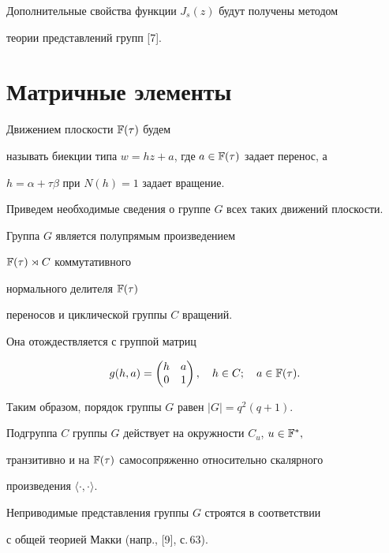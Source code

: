 Дополнительные свойства функции $J_s(z)$ будут получены методом 


теории представлений групп [7].





\section{Матричные элементы}





Движением плоскости $\Bbb F(\tau)$ будем


называть биекции типа $w=hz+a$, где $a\in{\Bbb F(\tau)}$ задает перенос, а


$h=\alpha+\tau\beta$ при $N(h)=1$ задает вращение.





Приведем необходимые сведения о группе $G$ всех таких движений плоскости.


Группа $G$ является полупрямым произведением


$\Bbb F(\tau)\rtimes{C}$ коммутативного


нормального делителя $\Bbb F(\tau)$


переносов и циклической группы $C$ вращений. 


Она отождествляется с группой матриц


$$


g(h,a)=\begin{pmatrix} h & a \\ 0 & 1 \end{pmatrix},\quad


h \in C;\quad a\in {\Bbb F(\tau)}.


$$





Таким образом, порядок группы $G$ равен $|G|=q^2(q+1)$.





Подгруппа $C$ группы $G$ действует на окружности $C_u$, $u\in{\Bbb F^*},$


транзитивно и на $\Bbb F(\tau)$ самосопряженно относительно скалярного


произведения $\langle\cdot,\cdot\rangle.$


Неприводимые представления группы $G$ строятся в соответствии


с общей теорией Макки (напр., [9], с.\,63).





